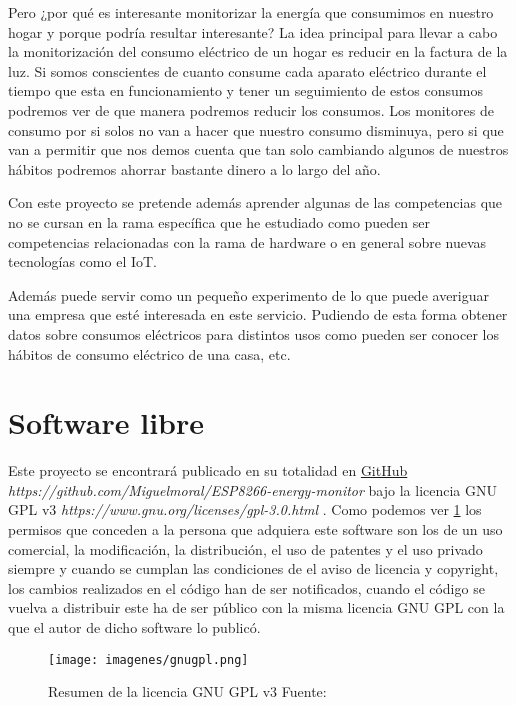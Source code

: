 Pero ¿por qué es interesante monitorizar la energía que consumimos en nuestro hogar y porque podría resultar interesante? La idea principal para llevar a cabo la monitorización del consumo eléctrico  de un hogar es reducir en la factura de la luz. Si somos conscientes de cuanto consume cada aparato eléctrico durante el tiempo que esta en funcionamiento y tener un seguimiento de estos consumos podremos ver de que manera podremos reducir los consumos. Los monitores de consumo por si solos no van a hacer que nuestro consumo disminuya, pero si que van a permitir que nos demos cuenta que tan solo cambiando algunos de nuestros hábitos podremos ahorrar bastante dinero a lo largo del año.

Con este proyecto se pretende además aprender algunas de las competencias que no se cursan en la rama específica que he estudiado como pueden ser competencias relacionadas con la rama de hardware o en general sobre nuevas tecnologías como el IoT. 

Además puede servir como un pequeño experimento de lo que puede averiguar una empresa que esté interesada en este servicio. Pudiendo de esta forma obtener datos sobre consumos eléctricos para distintos usos como pueden ser conocer los hábitos de consumo eléctrico de una casa, etc.

\section{Software libre}

Este proyecto se encontrará publicado en su totalidad en  \href{https://github.com/Miguelmoral/ESP8266-energy-monitor}{GitHub} \textit{https://github.com/Miguelmoral/ESP8266-energy-monitor} bajo la licencia GNU GPL v3 \textit{https://www.gnu.org/licenses/gpl-3.0.html} \cite{gnugpl}. Como podemos ver \ref{fig:grafGNU} los permisos que conceden a la persona que adquiera este software son los de un uso comercial, la modificación, la distribución, el uso de patentes y el uso privado siempre y cuando se cumplan las condiciones de el aviso de licencia y copyright, los cambios realizados en el código han de ser notificados, cuando el código se vuelva a distribuir este ha de ser público con la misma licencia GNU GPL con la que el autor de dicho software lo publicó.

\begin{figure}[H]
	\centering
	\texttt{[image: imagenes/gnugpl.png]}
	\caption[Resumen de la licencia GNU GPL v3]{Resumen de la licencia GNU GPL v3 Fuente: \cite{gitlicencia} }
	\label{fig:grafGNU}
\end{figure}

